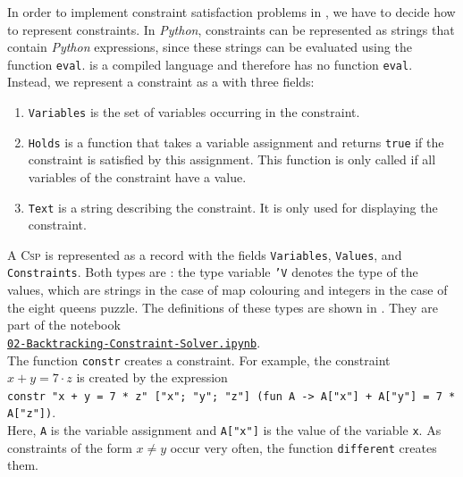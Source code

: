 In order to implement constraint satisfaction problems in \Fsharp, we have to decide how to represent
constraints.  In \textsl{Python}, constraints can be represented as strings that contain \textsl{Python}
expressions, since these strings can be evaluated using the function \texttt{eval}.  \Fsharp{} is a compiled
language and therefore has no function \texttt{eval}.  Instead, we represent a constraint as a  with
three fields:
\begin{enumerate}
\item \texttt{Variables} is the set of variables occurring in the constraint.
\item \texttt{Holds} is a function that takes a variable assignment and returns \texttt{true} if the constraint
      is satisfied by this assignment.  This function is only called if all variables of the constraint have a
      value.
\item \texttt{Text} is a string describing the constraint.  It is only used for displaying the constraint.
\end{enumerate}
A \textsc{Csp} is represented as a record with the fields \texttt{Variables}, \texttt{Values}, and
\texttt{Constraints}.  Both types are : the type variable \texttt{'V} denotes the type of the values,
which are strings in the case of map colouring and integers in the case of the eight queens puzzle.  The
definitions of these types are shown in .  They are part of the notebook
\\[0.2cm]
\hspace*{1.3cm}
\href{https://github.com/karlstroetmann/Logic/blob/master/F-Sharp/Chapter-5/02-Backtracking-Constraint-Solver.ipynb}{\texttt{02-Backtracking-Constraint-Solver.ipynb}}.
\\[0.2cm]
The function \texttt{constr} creates a constraint.  For example, the constraint $x + y = 7 \cdot z$ is created by
the expression
\\[0.2cm]
\hspace*{1.3cm}
\texttt{constr "x + y = 7 * z" ["x"; "y"; "z"] (fun A -> A["x"] + A["y"] = 7 * A["z"])}.
\\[0.2cm]
Here, \texttt{A} is the variable assignment and \texttt{A["x"]} is the value of the variable \texttt{x}.  As
constraints of the form $x \not= y$ occur very often, the function \texttt{different} creates them.

